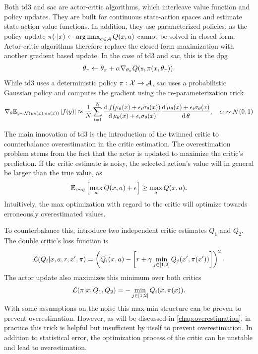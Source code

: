 Both \ac{td3} and \ac{sac} are actor-critic algorithms, which interleave value function and policy updates.
They are built for continuous state-action spaces and estimate state-action value functions.
In addition, they use parameterized policies, as the policy update $\pi(\cdot|x) \leftarrow \operatorname*{arg\,max}_{a \in \mathcal{A}} Q(x,a)$ cannot be solved in closed form.
Actor-critic algorithms therefore replace the closed form maximization with another gradient based update.
In the case of \ac{td3} and \ac{sac}, this is the \ac{dpg} \parencite{silver2014deterministic}
\begin{align}
    \theta_\pi \leftarrow \theta_\pi + \alpha \nabla_{\theta_\pi} Q(s, \pi(x, \theta_\pi)).
\end{align}
While \ac{td3} uses a deterministic policy $\pi: \mathcal{X} \rightarrow \mathcal{A}$, \ac{sac} uses a probabilistic Gaussian policy and computes the gradient using the re-parameterization trick
\begin{align}
    \nabla_{\theta} \mathbb{E}_{y \sim \mathcal{N}(\mu_\theta(x), \sigma_\theta(x))}\left[  f(y) \right] \approx \frac{1}{N} \sum_{i=1}^{N} \frac{\mathrm{d}\,f(\mu_\theta(x) + \epsilon_i \sigma_\theta(x))}{\mathrm{d}\, \mu_\theta(x) + \epsilon_i \sigma_\theta(x)}  \frac{\mathrm{d}\,\mu_\theta(x) + \epsilon_i \sigma_\theta(x)}{\mathrm{d}\,\theta}, \quad \epsilon_i \sim \mathcal{N}(0,1)
\end{align}

The main innovation of \ac{td3} is the introduction of the twinned critic to counterbalance overestimation in the critic estimation.
The overestimation problem stems from the fact that the actor is updated to maximize the critic's prediction.
If the critic estimate is noisy, the selected action's value will in general be larger than the true value, as
\begin{align}
    \mathbb{E}_{\epsilon\sim q}\left[  \max_a Q(x,a) + \epsilon \right] \geq \max_a Q(x,a).
\end{align}
Intuitively, the max optimization with regard to the critic will optimize towards erroneously overestimated values.

To counterbalance this, \textcite{fujimoto2018addressing} introduce two independent critic estimates $Q_1$ and $Q_2$.
The double critic's loss function is
\begin{align}
    \mathcal{L}(Q_i| x, a, r, x', \pi) = \left(Q_i(x,a) - \left[r + \gamma \min_{j \in [1,2]}Q_j(x', \pi(x'))\right]\right)^2.
\end{align}
The actor update also maximizes this minimum over both critics
\begin{align}
    \mathcal{L}(\pi| x, Q_1, Q_2) = - \min_{j \in [1,2]} Q_i(x, \pi(x)).
\end{align}
With some assumptions on the noise this max-min structure can be proven to prevent overestimation.
However, as will be discussed in \autoref{chap:overestimation}, in practice this trick is helpful but insufficient by itself to prevent overestimation.
In addition to statistical error, the optimization process of the critic can be unstable and lead to overestimation.

